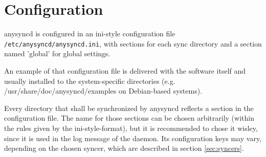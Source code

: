 \section{Configuration}
\label{sec:configuration}

anysyncd is configured in an ini-style configuration file \texttt{/etc/anysyncd/anysyncd.ini},
with sections for each sync directory and a section named 'global' for global
settings. 

An example of that configuration file is delivered with the software
itself and usually installed to the system-specific directories (e.g.
/usr/share/doc/anysyncd/examples on Debian-based systems).

Every directory that shall be synchronized by anysyncd reflects a section in
the configuration file. The name for those sections can be chosen arbitrarily
(within the rules given by the ini-style-format), but it is recommended to
chose it wisley, since it is used in the log message of the daemon. Its
configuration keys may vary, depending on the chosen syncer, which are described
in section \ref{sec:syncers}.

